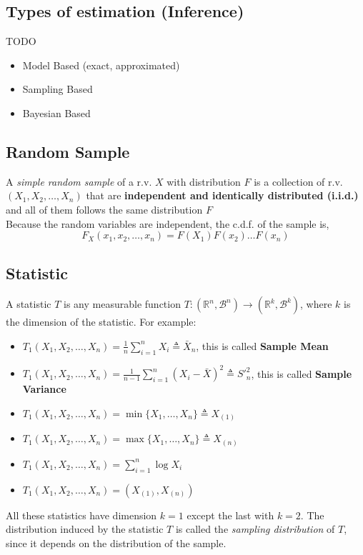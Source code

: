 \subsection{Types of estimation (Inference)}
TODO
\begin{itemize}
    \item Model Based (exact, approximated)
    \item Sampling Based
    \item Bayesian Based
\end{itemize}

\subsection{Random Sample}
A \textit{simple random sample} of a r.v. $X$ with distribution $F$ is a collection of r.v. $(X_1, X_2,\dots,X_n)$ that are 
\textbf{independent and identically distributed (i.i.d.)} and all of them follows the same distribution $F$\\

Because the random variables are independent, the c.d.f. of the sample is,
\[ F_X(x_1,x_2,\dots,x_n) = F(X_1)F(x_2)\dots F(x_n) \]

\subsection{Statistic}
A statistic $T$ is any measurable function $T: (\mathbb{R}^n,\mathcal{B}^n) \rightarrow (\mathbb{R}^k,\mathcal{B}^k)$, where $k$ 
is the dimension of the statistic. For example:
\begin{itemize}
    \item $T_1(X_1,X_2,\dots,X_n) = \frac{1}{n}\sum_{i=1}^{n}X_i \triangleq \bar{X}_n$, this is called \textbf{Sample Mean}
    \item $T_1(X_1,X_2,\dots,X_n) = \frac{1}{n-1}\sum_{i=1}^{n} (X_i-\bar{X})^2 \triangleq S'^2_n$, this is called \textbf{Sample Variance}
    \item $T_1(X_1,X_2,\dots,X_n) = \min \{ X_1,\dots,X_n \} \triangleq X_{(1)}$
    \item $T_1(X_1,X_2,\dots,X_n) = \max \{ X_1,\dots,X_n \} \triangleq X_{(n)}$
    \item $T_1(X_1,X_2,\dots,X_n) = \sum_{i=1}^{n} \log{X_i}$
    \item $T_1(X_1,X_2,\dots,X_n) = (X_{(1)}, X_{(n)})$
\end{itemize} 
All these statistics have dimension $k=1$ except the last with $k=2$. The distribution induced by the statistic $T$ is called the 
\textit{sampling distribution} of $T$, since it depends on the distribution of the sample.

